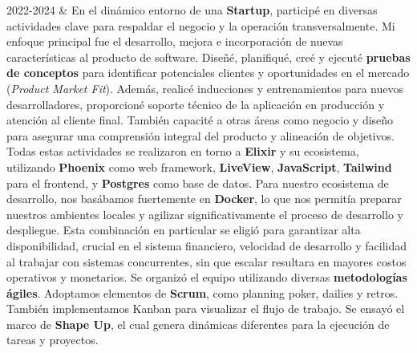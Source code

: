 \documentclass[
    changecolor={111, 156, 45}, 
]{cv-roald}
\begin{document}
\begin{tabularcv}
2022-2024 & 
\newline
\newline
En el dinámico entorno de una \textbf{Startup}, participé en diversas actividades clave para respaldar el negocio y la operación transversalmente. Mi enfoque principal fue el desarrollo, mejora e incorporación de nuevas características al producto de software. Diseñé, planifiqué, creé y ejecuté \textbf{pruebas de conceptos} para identificar potenciales clientes y oportunidades en el mercado (\textit{Product Market Fit}). Además, realicé inducciones y entrenamientos para nuevos desarrolladores, proporcioné soporte técnico de la aplicación en producción y atención al cliente final. También capacité a otras áreas como negocio y diseño para asegurar una comprensión integral del producto y alineación de objetivos. Todas estas actividades se realizaron en torno a \textbf{Elixir} y su ecosistema, utilizando \textbf{Phoenix} como web framework, \textbf{LiveView}, \textbf{JavaScript}, \textbf{Tailwind} para el frontend, y \textbf{Postgres} como base de datos. Para nuestro ecosistema de desarrollo, nos basábamos fuertemente en \textbf{Docker}, lo que nos permitía preparar nuestros ambientes locales y agilizar significativamente el proceso de desarrollo y despliegue. Esta combinación en particular se eligió para garantizar alta disponibilidad, crucial en el sistema financiero, velocidad de desarrollo y facilidad al trabajar con sistemas concurrentes, sin que escalar resultara en mayores costos operativos y monetarios. Se organizó el equipo utilizando diversas \textbf{metodologías ágiles}. Adoptamos elementos de \textbf{Scrum}, como planning poker, dailies y retros. También implementamos Kanban para visualizar el flujo de trabajo. Se ensayó el marco de \textbf{Shape Up}, el cual genera dinámicas diferentes para la ejecución de tareas y proyectos.



\end{tabularcv}
\end{document}
